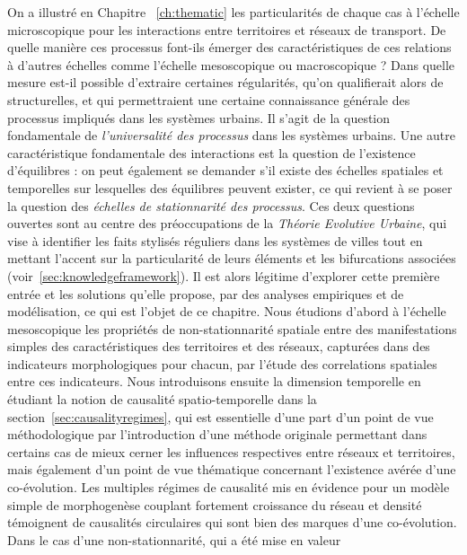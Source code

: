 On a illustré en Chapitre ~\ref{ch:thematic} les particularités de chaque cas à l'échelle microscopique pour les interactions entre territoires et réseaux de transport. De quelle manière ces processus font-ils émerger des caractéristiques de ces relations à d'autres échelles comme l'échelle mesoscopique ou macroscopique ? Dans quelle mesure est-il possible d'extraire certaines régularités, qu'on qualifierait alors de structurelles, et qui permettraient une certaine connaissance générale des processus impliqués dans les systèmes urbains. Il s'agit de la question fondamentale de \emph{l'universalité des processus}  
dans les systèmes urbains. Une autre caractéristique fondamentale des interactions est la question de l'existence d'équilibres : on peut également se demander s'il existe des échelles spatiales et temporelles sur lesquelles des équilibres peuvent exister, ce qui revient à se poser la question des \emph{échelles de stationnarité des processus}. Ces deux questions ouvertes sont au centre des préoccupations de la \emph{Théorie Evolutive Urbaine}, qui vise à identifier les faits stylisés réguliers dans les systèmes de villes tout en mettant l'accent sur la particularité de leurs éléments et les bifurcations associées (voir~\ref{sec:knowledgeframework}). Il est alors légitime d'explorer cette première entrée et les solutions qu'elle propose, par des analyses empiriques et de modélisation, ce qui est l'objet de ce chapitre. Nous étudions d'abord à l'échelle mesoscopique les propriétés de non-stationnarité spatiale entre des manifestations simples des caractéristiques des territoires et des réseaux, capturées dans des indicateurs morphologiques pour chacun, par l'étude des correlations spatiales entre ces indicateurs. Nous introduisons ensuite la dimension temporelle en étudiant la notion de causalité spatio-temporelle dans la section~\ref{sec:causalityregimes}, qui est essentielle d'une part d'un point de vue méthodologique par l'introduction d'une méthode originale permettant dans certains cas de mieux cerner les influences respectives entre réseaux et territoires, mais également d'un point de vue thématique concernant l'existence avérée d'une co-évolution. Les multiples régimes de causalité mis en évidence pour un modèle simple de morphogenèse couplant fortement croissance du réseau et densité témoignent de causalités circulaires qui sont bien des marques d'une co-évolution. Dans le cas d'une non-stationnarité, qui a été mise en valeur 